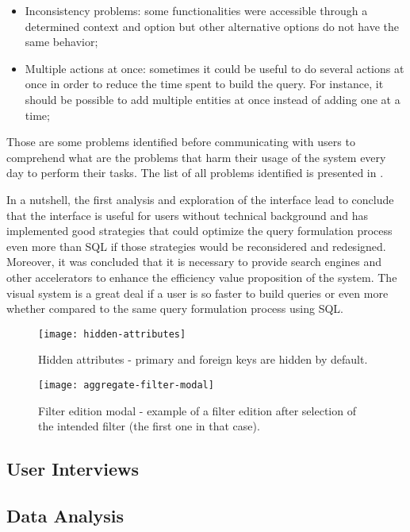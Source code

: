 \begin{itemize}
    \item Inconsistency problems: some functionalities were accessible through a determined context and option but other alternative options do not have the same behavior;
    \item Multiple actions at once: sometimes it could be useful to do several actions at once in order to reduce the time spent to build the query. For instance, it should be possible to add multiple entities at once instead of adding one at a time; 
\end{itemize}

Those are some problems identified before communicating with users to comprehend what are the problems that harm their usage of the system every day to perform their tasks. The list of all problems identified is presented in .

In a nutshell, the first analysis and exploration of the interface lead to conclude that the interface is useful for users without technical background and has implemented good strategies that could optimize the query formulation process even more than SQL if those strategies would be reconsidered and redesigned. Moreover, it was concluded that it is necessary to provide search engines and other accelerators to enhance the efficiency value proposition of the system. The visual system is a great deal if a user is so faster to build queries or even more whether compared to the same query formulation process using SQL.

\begin{figure}[htbp]
	\centering
	\texttt{[image: hidden-attributes]}
	\caption{Hidden attributes - primary and foreign keys are hidden by default.}
	\label{fig:hiddenAttributes}
\end{figure}

\begin{figure}[htbp]
	\centering
	\texttt{[image: aggregate-filter-modal]}
	\caption{Filter edition modal - example of a filter edition after selection of the intended filter (the first one in that case).}
	\label{fig:aggregateFilterModal}
\end{figure}

\subsection{User Interviews}
\label{subsec:user_interviews}

\subsection{Data Analysis}
\label{subsec:data_analysis}

